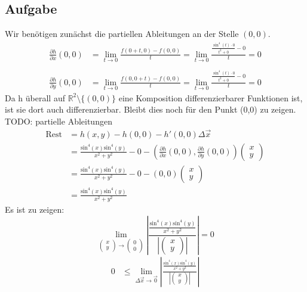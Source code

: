 \documentclass[10pt,a4paper,parskip=half]{scrartcl}
\begin{document}
\begin{enumerate}[(i)]
\section{Aufgabe}
Wir benötigen zunächst die partiellen Ableitungen an der Stelle $(0,0)$.
\begin{align*}
\frac{\partial h}{\partial x} (0,0) &= \lim_{t \to 0} \frac{f(0+t,0)-f(0,0)}{t} = \lim_{t \to 0} \frac{\frac{\sin^4(t)\cdot 0}{t^2+0}-0}{t} = 0\\
\\
\frac{\partial h}{\partial y} (0,0) &= \lim_{t \to 0} \frac{f(0,0+t) - f(0,0)}{t} = \lim_{t \to 0} \frac{\frac{\sin^4(t)\cdot 0}{t^2+0}-0}{t} = 0
\end{align*}
Da h überall auf $\mathbb R^2\setminus{\{(0,0)\}}$ eine Komposition differenzierbarer Funktionen ist, ist sie dort auch differenzierbar. Bleibt dies noch für den Punkt (0,0) zu zeigen.
TODO: partielle Ableitungen
\begin{align*}
\text{Rest} &= h(x,y) - h(0,0) - h'(0,0) \Delta \vec x\\
&= \frac{\text{sin}^4(x)\text{sin}^4(y)}{x^2 + y^2} - 0 - \left(\frac{\partial h}{\partial x}(0,0),\frac{\partial h}{\partial y}(0,0)\right) \begin{pmatrix}x\\y\end{pmatrix}\\
&= \frac{\text{sin}^4(x)\text{sin}^4(y)}{x^2 + y^2} - 0 - (0,0) \begin{pmatrix}x\\y\end{pmatrix}\\
&= \frac{\text{sin}^4(x)\text{sin}^4(y)}{x^2 + y^2}
\end{align*}
Es ist zu zeigen: $$\lim_{\begin{pmatrix}x\\y\end{pmatrix} \to \begin{pmatrix}0\\0\end{pmatrix}} \left|\frac{\frac{\text{sin}^4(x)\text{sin}^4(y)}{x^2 + y^2}}{\left|\begin{pmatrix}x\\y\end{pmatrix}\right|}\right| = 0$$
\begin{align*}
0 &\le\lim_{\Delta \vec x \to \vec 0} \left|\frac{\frac{\text{sin}^4(x)\text{sin}^4(y)}{x^2 + y^2}}{\left|\begin{pmatrix}x\\y\end{pmatrix} \right|}\right| \\

\end{align*}
\end{enumerate}
\end{document}
